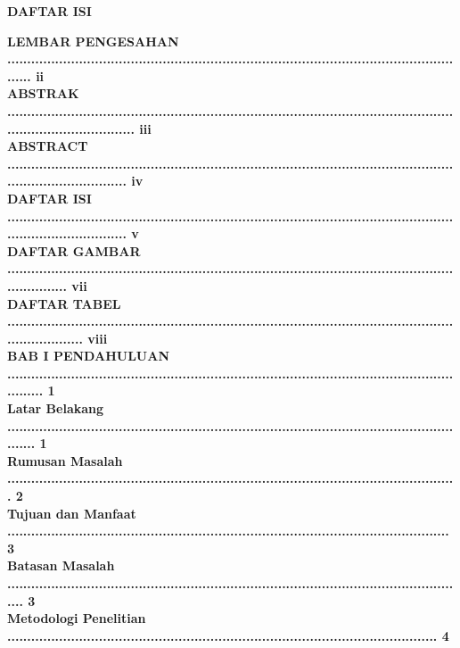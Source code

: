 \begin{center}
\textbf{\Large DAFTAR ISI }
\end{center}
\textbf{\indent LEMBAR PENGESAHAN ...................................................................................................................... ii}\\
\textbf{\indent ABSTRAK ................................................................................................................................................ iii}\\
\textbf{\indent ABSTRACT .............................................................................................................................................. iv}\\
\textbf{\indent DAFTAR ISI .............................................................................................................................................. v}\\
\textbf{\indent DAFTAR GAMBAR ............................................................................................................................... vii}\\
\textbf{\indent DAFTAR TABEL ................................................................................................................................... viii}\\
\textbf{\indent BAB I PENDAHULUAN ......................................................................................................................... 1}\\
\textbf{\indent {} \indent	Latar Belakang ....................................................................................................................... 1}\\
\textbf{\indent {} \indent	Rumusan Masalah ................................................................................................................. 2}\\
\textbf{\indent {} \indent	Tujuan dan Manfaat ............................................................................................................... 3}\\
\textbf{\indent {} \indent	Batasan Masalah .................................................................................................................... 3}\\
\textbf{\indent {} \indent	Metodologi Penelitian ............................................................................................................ 4}\\
